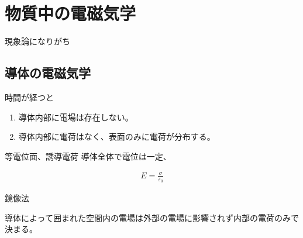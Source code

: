 \documentclass[uplatex,dvipdfmx,a4paper,11pt]{jlreq}
\numberwithin{equation}{section}
\theoremstyle{definition}
\begin{document}
\begin{theorem}[Fresnel 回折]
\end{theorem}



\section{物質中の電磁気学}
現象論になりがち

\subsection{導体の電磁気学}
\begin{definition}[導体]
  時間が経つと
  \begin{enumerate}
    \item 導体内部に電場は存在しない。
    \item 導体内部に電荷はなく、表面のみに電荷が分布する。
  \end{enumerate}
  等電位面、誘導電荷
  導体全体で電位は一定、
\end{definition}

\begin{theorem}
  \begin{align}
    E = \frac{\sigma}{\varepsilon_0}
  \end{align}
\end{theorem}

\begin{proposition}[一様に分極した誘電体球の分極電場]
\end{proposition}

\begin{proposition}[一様に分極した回転楕円体形状の誘電体の分極電場]
\end{proposition}

\begin{theorem}[静電誘導]

\end{theorem}

\begin{proposition}[半無限導体と点電荷]
  鏡像法
\end{proposition}

\begin{proposition}[一様外部電場中の導体球]
\end{proposition}

\begin{definition}[静電遮蔽]
  導体によって囲まれた空間内の電場は外部の電場に影響されず内部の電荷のみで決まる。
\end{definition}
\end{document}
